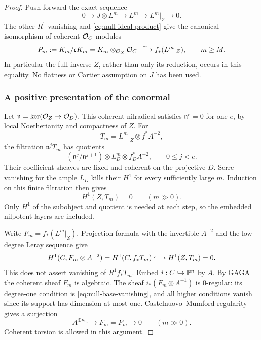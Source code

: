 \begin{proof}
Push forward the exact sequence
\[
 0\longrightarrow J\otimes L^m\longrightarrow L^m
 \longrightarrow L^m|_Z\longrightarrow0 .
\]
The other \(R^1\) vanishing and \eqref{eq:null-ideal-product} give the
canonical isomorphism of coherent \(\mathcal O_C\)-modules
\begin{equation}\label{eq:null-full-quotient}
 P_m:=K_m/\mathfrak cK_m
   =K_m\otimes_{\mathcal O_X}\mathcal O_C
   \xrightarrow{\ \sim\ } f_*(L^m|_Z),\qquad m\geq M .
\end{equation}
In particular the full inverse \(Z\), rather than only its reduction,
occurs in this equality.  No flatness or Cartier assumption on \(J\)
has been used.

\subsubsection*{A positive presentation of the conormal}

Let \(\mathfrak n=\ker(\mathcal O_Z\to\mathcal O_D)\).  This coherent nilradical
satisfies \(\mathfrak n^e=0\) for one \(e\), by local Noetherianity and
compactness of \(Z\).  For
\[
 T_m=L^m|_Z\otimes f^*A^{-2},
\]
the filtration \(\mathfrak n^jT_m\) has quotients
\[
 (\mathfrak n^j/\mathfrak n^{j+1})\otimes
 L_D^m\otimes f_D^*A^{-2},\qquad 0\leq j<e.
\]
Their coefficient sheaves are fixed and coherent on the projective
\(D\).  Serre vanishing for the ample \(L_D\) kills their \(H^1\) for
every sufficiently large \(m\).  Induction on this finite filtration
then gives
\[
 H^1(Z,T_m)=0\qquad(m\gg0).
\]
Only \(H^1\) of the subobject and quotient is needed at each step, so
the embedded nilpotent layers are included.

Write \(F_m=f_*(L^m|_Z)\).  Projection formula with the invertible
\(A^{-2}\) and the low-degree Leray sequence give
\begin{equation}\label{eq:null-base-vanishing}
 H^1(C,F_m\otimes A^{-2})
   =H^1(C,f_*T_m)\lhook\joinrel\longrightarrow H^1(Z,T_m)=0 .
\end{equation}
This does not assert vanishing of \(R^1f_*T_m\).  Embed
\(i:C\hookrightarrow\mathbb P^n\) by \(A\).  By GAGA the coherent sheaf
\(F_m\) is algebraic.  The sheaf \(i_*(F_m\otimes A^{-1})\) is
\(0\)-regular: its degree-one condition is
\eqref{eq:null-base-vanishing}, and all higher conditions vanish since
its support has dimension at most one.  Castelnuovo--Mumford regularity
\cite[Tag~08A8, Lemma~33.35.12]{StacksProject} gives a surjection
\begin{equation}\label{eq:null-positive-presentation}
 A^{\oplus n_m}\longrightarrow F_m=P_m\longrightarrow0
 \qquad(m\gg0).
\end{equation}
Coherent torsion is allowed in this argument.


\end{proof}

